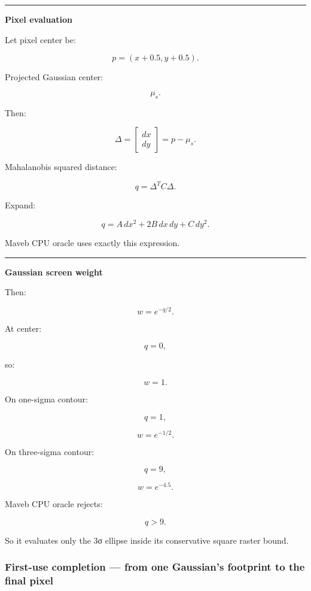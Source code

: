 \begin{center}\rule{0.5\linewidth}{0.5pt}\end{center}

\textbf{Pixel evaluation}

Let pixel center be:

\[
p=
(x+0.5,y+0.5).
\]

Projected Gaussian center:

\[
\mu_s.
\]

Then:

\[
\Delta=
\begin{bmatrix}
dx\\dy
\end{bmatrix}
=
p-\mu_s.
\]

Mahalanobis squared distance:

\[
q=
\Delta^T
C
\Delta.
\]

Expand:

\[
\boxed{
q=
A\,dx^2
+
2B\,dx\,dy
+
C\,dy^2.
}
\]

Maveb CPU oracle uses exactly this expression.

\begin{center}\rule{0.5\linewidth}{0.5pt}\end{center}

\textbf{Gaussian screen weight}

Then:

\[
\boxed{
w=
e^{-q/2}.
}
\]

At center:

\[
q=0,
\]

so:

\[
w=1.
\]

On one-sigma contour:

\[
q=1,
\]

\[
w=e^{-1/2}.
\]

On three-sigma contour:

\[
q=9,
\]

\[
w=e^{-4.5}.
\]

Maveb CPU oracle rejects:

\[
q>9.
\]

So it evaluates only the 3σ ellipse inside its conservative square raster bound.

\subsubsection{First-use completion --- from one Gaussian's footprint to the final pixel}\label{04-visual-computing-ii-ch038-first-use-completion-from-one-gaussians-footprint-to-the-final-pixel}

